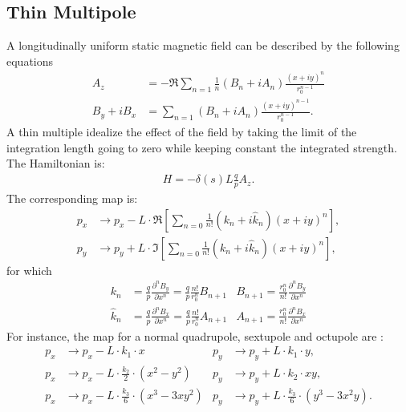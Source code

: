 \documentclass[english]{article}
\def\PnD#1#2#3{\frac{\partial^{#3} #1}{\partial #2^{#3}}}
\begin{document}
\subsection{Thin Multipole}
A longitudinally uniform static magnetic field can be described by the following equations
\begin{align}
  A_z&= - \Re \sum_{n=1} \frac1n \left(B_n+iA_n\right) 
    \frac{(x+iy)^n}{r_0^{n-1}}\\
    B_y+iB_x&=\sum_{n=1} \left(B_n+iA_n\right) \frac{(x+iy)^{n-1}}{r_0^{n-1}}.
\end{align}
A thin multiple idealize the effect of the field by taking the limit of the integration 
length going to zero while keeping constant the integrated strength. The Hamiltonian is:
\begin{align}
  H=- \delta(s) L \frac qp A_z.
\end{align}
The corresponding map is:
\begin{align}
  p_x &\to p_x - L\cdot\Re\left[\sum_{n=0} \frac{1}{n!} (k_n + i\hat k_n) (x+iy)^n \right], \\
  p_y &\to p_y + L\cdot\Im\left[\sum_{n=0} \frac{1}{n!} (k_n + i\hat k_n) (x+iy)^n \right],
\end{align}
for which
\begin{align}
  k_n&= \frac qp \PnD{B_y}{x}{n}
         = \frac qp \frac{n!}{r_0^n}  B_{n+1} &
  B_{n+1}= \frac {r_0^n}{n!}   \PnD{B_y}{x}{n} \\
  \hat k_n&= \frac qp \PnD{B_x}{x}{n}
         = \frac qp \frac{n!}{r_0^n}  A_{n+1} &
  A_{n+1}= \frac {r_0^n}{n!}   \PnD{B_x}{x}{n}
\end{align}
For instance, the map for a normal quadrupole, sextupole and octupole are :
\begin{align}
  p_x & \to p_x - L \cdot {k_1}\cdot x &
  p_y & \to p_y + L \cdot {k_1}\cdot y, \\
  p_x & \to p_x - L \cdot \frac{k_2}{2}\cdot (x^2-y^2) &
  p_y & \to p_y + L \cdot k_2 \cdot xy,\\
  p_x & \to p_x - L \cdot \frac{k_3}{6}\cdot(x^3 - 3xy^2) &
  p_y & \to p_y + L \cdot \frac{k_3}{6}\cdot(y^3 - 3x^2y) .
\end{align}
\end{document}
